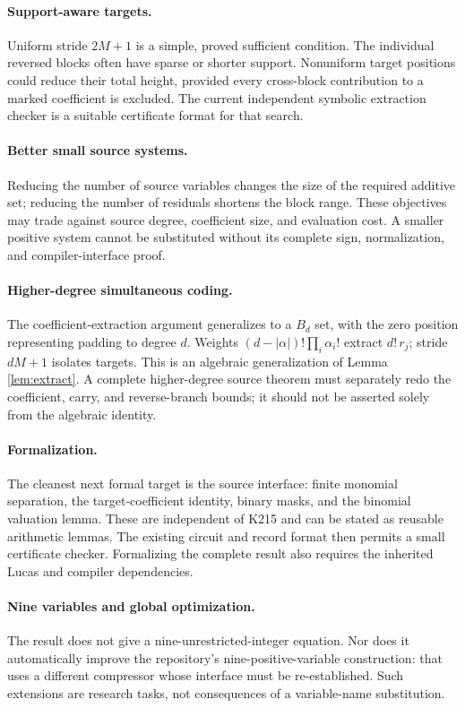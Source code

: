 \documentclass[11pt,a4paper]{article}
\theoremstyle{remark}
\begin{document}
\paragraph{Support-aware targets.}
Uniform stride \(2M+1\) is a simple, proved sufficient condition.
The individual reversed blocks often have sparse or shorter
support. Nonuniform target positions could reduce their total
height, provided every cross-block contribution to a marked
coefficient is excluded. The current independent symbolic
extraction checker is a suitable certificate format for that
search.

\paragraph{Better small source systems.}
Reducing the number of source variables changes the size of the
required additive set; reducing the number of residuals shortens
the block range. These objectives may trade against source
degree, coefficient size, and evaluation cost. A smaller
positive system cannot be substituted without its complete
sign, normalization, and compiler-interface proof.

\paragraph{Higher-degree simultaneous coding.}
The coefficient-extraction argument generalizes to a \(B_d\) set,
with the zero position representing padding to degree \(d\).
Weights \((d-|\alpha|)!\prod_i\alpha_i!\) extract
\(d!\,r_j\); stride \(dM+1\) isolates targets.
This is an algebraic generalization of Lemma \ref{lem:extract}.
A complete higher-degree source theorem must separately redo
the coefficient, carry, and reverse-branch bounds; it should not
be asserted solely from the algebraic identity.

\paragraph{Formalization.}
The cleanest next formal target is the source interface:
finite monomial separation, the target-coefficient identity,
binary masks, and the binomial valuation lemma. These are
independent of K215 and can be stated as reusable arithmetic
lemmas. The existing circuit and record format then permits a
small certificate checker. Formalizing the complete result
also requires the inherited Lucas and compiler dependencies.

\paragraph{Nine variables and global optimization.}
The result does not give a nine-unrestricted-integer equation.
Nor does it automatically improve the repository's
nine-positive-variable construction: that uses a different
compressor whose interface must be re-established.
Such extensions are research tasks, not consequences of a
variable-name substitution.
\end{document}
